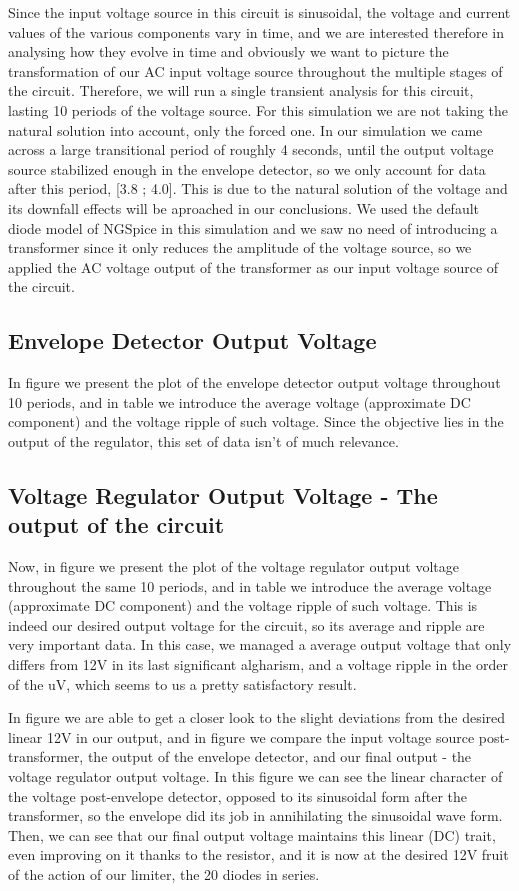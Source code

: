 Since the input voltage source in this circuit is sinusoidal, the voltage and current values of the various components vary in time, and we are interested therefore in analysing how they evolve in time and obviously we want to picture the transformation of our AC input voltage source throughout the multiple stages of the circuit. Therefore, we will run a single transient analysis for this circuit, lasting 10 periods of the voltage source. For this simulation we are not taking the natural solution into account, only the forced one. In our simulation we came across a large transitional period of roughly 4 seconds, until the output voltage source stabilized enough in the envelope detector, so we only account for data after this period, [3.8 ; 4.0]. This is due to the natural solution of the voltage and its downfall effects will be aproached in our conclusions. We used the default diode model of NGSpice in this simulation and we saw no need of introducing a transformer since it only reduces the amplitude of the voltage source, so we applied the AC voltage output of the transformer as our input voltage source of the circuit.
\subsection{Envelope Detector Output Voltage}
In figure we present the plot of the envelope detector output voltage throughout 10 periods, and in table we introduce the average voltage (approximate DC component) and the voltage ripple of such voltage. Since the objective lies in the output of the regulator, this set of data isn't of much relevance.

\subsection{Voltage Regulator Output Voltage - The output of the circuit}
Now, in figure we present the plot of the voltage regulator output voltage throughout the same 10 periods, and in table we introduce the average voltage (approximate DC component) and the voltage ripple of such voltage. This is indeed our desired output voltage for the circuit, so its average and ripple are very important data. In this case, we managed a average output voltage that only differs from 12V in its last significant algharism, and a voltage ripple in the order of the uV, which seems to us a pretty satisfactory result.

In figure we are able to get a closer look to the slight deviations from the desired linear 12V in our output, and in figure we compare the input voltage source post-transformer, the output of the envelope detector, and our final output - the voltage regulator output voltage. In this figure we can see the linear character of the voltage post-envelope detector, opposed to its sinusoidal form after the transformer, so the envelope did its job in annihilating the sinusoidal wave form. Then, we can see that our final output voltage maintains this linear (DC) trait, even improving on it thanks to the resistor, and it is now at the desired 12V fruit of the action of our limiter, the 20 diodes in series.

